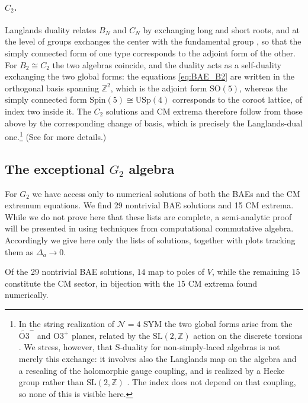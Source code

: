 \documentclass[aps, prx, nofootinbib, twocolumn,amsfonts,amsmath,amssymb,mathtools,superscriptaddress,preprintnumbers,floatfix,reprint]{revtex4-2}
\begin{document}
\paragraph{\texorpdfstring{$C_2$}{C2}.}
Langlands duality relates $B_N$ and $C_N$ by exchanging long and short roots,
and at the level of groups exchanges the center with the fundamental group
\cite{Goddard:1976qe}, so that the simply connected form of one type
corresponds to the adjoint form of the other. For $B_2\cong C_2$ the two
algebras coincide, and the duality acts as a self-duality exchanging the two
global forms: the equations \eqref{eq:BAE_B2} are written in the orthogonal
basis spanning $\mathbb{Z}^2$, which is the adjoint form $\mathrm{SO}(5)$,
whereas the simply connected form $\mathrm{Spin}(5)\cong\mathrm{USp}(4)$
corresponds to the coroot lattice, of index two inside it. The $C_2$ solutions
and CM extrema therefore follow from those above by the corresponding change of
basis, which is precisely the Langlands-dual one.\footnote{In the string
realization of $\mathcal{N}=4$ SYM the two global forms arise from the
$\widetilde{\mathrm{O3}}^-$ and $\mathrm{O3}^+$ planes, related by the
$\mathrm{SL}(2,\mathbb{Z})$ action on the discrete torsions
\cite{Witten:1998xy,Hanany:2000fq}. We stress, however, that S-duality for
non-simply-laced algebras is not merely this exchange: it involves also the
Langlands map on the algebra and a rescaling of the holomorphic gauge coupling,
and is realized by a Hecke group rather than $\mathrm{SL}(2,\mathbb{Z})$
\cite{Argyres:2006qr}. The index does not depend on that coupling, so none of
this is visible here.} (See \cite{B2paper} for more details.)

\subsection{\texorpdfstring{The exceptional $G_2$ algebra}{The exceptional G2 algebra}}
\label{sub:G2}

For $G_2$ we have access only to numerical solutions of both the BAEs and the CM
extremum equations. We find 29 nontrivial BAE solutions and 15 CM extrema.
While we do not prove here that these lists are complete, a semi-analytic proof
will be presented in \cite{polypaper} using techniques from computational
commutative algebra. Accordingly we give here only the lists of solutions,
together with plots tracking them as $\Delta_a\to0$.

Of the 29 nontrivial BAE solutions, $14$ map to poles of $V$, while the
remaining $15$ constitute the CM sector, in bijection with the 15 CM extrema
found numerically.
\end{document}
